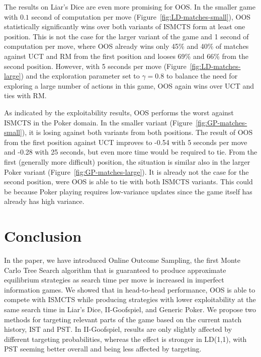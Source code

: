 \documentclass{aamas2015}
\newcounter{mlNoteCounter}
\newcommand{\mlnote}[1]{{\scriptsize \color{darkgreen} $\blacksquare$ \refstepcounter{mlNoteCounter}\textsf{[ML]$_{\arabic{mlNoteCounter}}$:{#1}}}}
\renewcommand{\mlnote}[1]{}
\begin{document}
The results on Liar's Dice are even more promising for OOS. In the smaller game with $0.1$ second of computation per move (Figure~\ref{fig:LD-matches-small}), OOS statistically significantly wins over both variants of ISMCTS form at least one position. This is not the case for the larger variant of the game and 1 second of computation per move, where OOS already wins only 45\% and 40\% of matches against UCT and RM from the first position and looses 69\% and 66\% from the second position. 
However, with 5 seconds per move (Figure~\ref{fig:LD-matches-large}) and the exploration parameter set to $\gamma=0.8$ to balance the need for exploring a large number of actions in this game, OOS again wins over UCT and ties with RM.

As indicated by the exploitability results, OOS performs the worst against ISMCTS in the Poker domain. In the smaller variant (Figure~\ref{fig:GP-matches-small}), it is losing against both variants from both positions. The result of OOS from the first position against UCT improves to -0.54 with 5 seconds per move and -0.28 with 25 seconds, but even more time would be required to tie. From the first (generally more difficult) position, the situation is similar also in the larger Poker variant (Figure~\ref{fig:GP-matches-large}). It is already not the case for the second position, were OOS is able to tie with both ISMCTS variants. 
This could be because Poker playing requires low-variance updates since the game itself has already has high variance. 



\section{Conclusion}

\mlnote{Still needs expanding.}
In the paper, we have introduced Online Outcome Sampling, the first Monte Carlo 
Tree Search algorithm that is guaranteed to produce  
approximate equilibrium strategies as search time per move is increased in imperfect information games.
We showed that in head-to-head performance, OOS is able to compete with 
ISMCTS while producing strategies with lower exploitability
at the same search time in Liar's Dice, II-Goofspiel, and Generic Poker.
We propose two methods for targeting relevant parts of the game based on the current match history, 
IST and PST.
In II-Goofspiel, results are only slightly affected by different targeting probabilities, whereas the
effect is stronger in LD(1,1), with PST seeming better overall and being less affected by targeting. 
\end{document}
